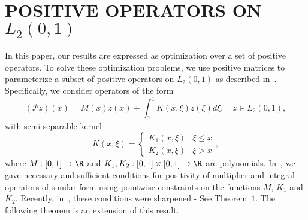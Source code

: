 \documentclass[US letter, 9 pt, conference]{ieeeconf}  \usepackage{setspace}
\newcommand{\lt}{L_2(0,1)}
\begin{document}
\section{POSITIVE OPERATORS ON $\lt$}\label{sec:posop}
In this paper, our results are expressed as optimization over a set of positive operators. To solve these optimization problems, we use positive matrices to parameterize a subset of positive operators on $\lt$ as described in~\cite{peetlmi}. Specifically, we consider operators of the form
\begin{equation}\label{eqn:Poperator}
(\mathcal{P}z)(x)=M(x)z(x) +  \int_0^1 K(x,\xi)z(\xi)d\xi, \quad z\in \lt,
\end{equation} with semi-separable kernel
\[
K(x,\xi) = \begin{cases} K_1(x,\xi) & \xi \leq x \\
K_2(x,\xi) &  \xi>x \end{cases} ,\]
where $M:[0,1] \rightarrow \R$ and $K_1,K_2: [0,1] \times [0,1] \rightarrow \R$ are polynomials.  In~\cite{peet2008using}, we gave necessary and sufficient conditions for positivity of multiplier and integral operators of similar form using pointwise constraints on the functions $M$, $K_1$ and $K_2$. Recently, in~\cite{peetlmi}, these conditions were sharpened - See Theorem~$1$. The following theorem is an extension of this result.
\end{document}
